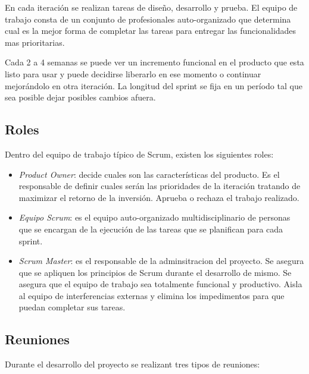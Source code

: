 \documentclass[12pt,a4paper]{article}
\begin{document}
	En cada iteración se realizan tareas de diseño, desarrollo y prueba. El equipo de trabajo consta de un conjunto de profesionales auto-organizado que determina cual es la mejor forma de completar las tareas para entregar las funcionalidades mas prioritarias.
	
	Cada 2 a 4 semanas se puede ver un incremento funcional en el producto que esta listo para usar y puede decidirse liberarlo en ese momento o continuar mejorándolo en otra iteración. La longitud del sprint se fija en un período tal que sea posible dejar posibles cambios afuera.

	\subsection{Roles}

	Dentro del equipo de trabajo típico de Scrum, existen los siguientes roles:
	
	\begin{itemize}
	\item \textit{Product Owner}: decide cuales son las características del producto. Es el responsable de definir cuales serán las prioridades de la iteración tratando de maximizar el retorno de la inversión. Aprueba o rechaza el trabajo realizado.

	\item \textit{Equipo Scrum}: es el equipo auto-organizado multidisciplinario de personas que se encargan de la ejecución de las tareas que se planifican para cada sprint.

	\item \textit{Scrum Master}: es el responsable de la adminsitracion del proyecto. Se asegura que se apliquen los principios de Scrum durante el desarrollo de mismo. Se asegura que el equipo de trabajo sea totalmente funcional y productivo. Aisla al equipo de interferencias externas y elimina los impedimentos para que puedan completar sus tareas.
	
	\end{itemize}

	\subsection{Reuniones}
	Durante el desarrollo del proyecto se realizant tres tipos de reuniones:
\end{document}
